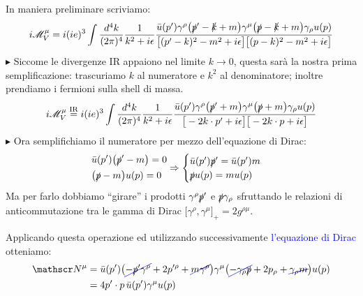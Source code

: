 \documentclass[../main.tex]{subfiles}
\begin{document}
In maniera preliminare scriviamo:
\begin{align*}
    i\mathscr M^\mu_V = i(ie)^3\int\frac{d^4k}{(2\pi)^4}\frac{1}{k^2+i\epsilon}\frac{\bar u(p')\gamma^\rho\big(\slashed p'-\slashed k + m\big)\gamma^\mu\big(\slashed p-\slashed k + m\big)\gamma_\rho u(p)}{\big[(p'-k)^2 -m^2 + i\epsilon\big]\big[(p-k)^2 -m^2 + i\epsilon\big]}
\end{align*}
$\blacktriangleright$ Siccome le divergenze IR appaiono nel limite \(\boxed{k\rightarrow0}\), questa sarà la nostra prima semplificazione: trascuriamo \(k\) al numeratore e \(k^2\) al denominatore; inoltre prendiamo i fermioni sulla shell di massa.
\begin{align*}
    i\mathscr M^\mu_V \overset{\text{IR}}{=} i(ie)^3\int\frac{d^4k}{(2\pi)^4}\frac{1}{k^2+i\epsilon}\frac{\bar u(p')\gamma^\rho\big(\slashed p' + m\big)\gamma^\mu\big(\slashed p+ m\big)\gamma_\rho u(p)}{\big[-2k\cdot p' + i\epsilon\big]\big[-2k\cdot p + i\epsilon\big]}
\end{align*}
$\blacktriangleright$ Ora semplifichiamo il numeratore per mezzo dell'equazione di Dirac:
\[
\begin{aligned}
    &\bar u(p') \big(\slashed p' - m\big) = 0  \\
    &\big(\slashed p - m\big)u(p) = 0
\end{aligned}
\Rightarrow
\begin{cases}
    \bar u(p') \slashed p' = \bar u(p')m \\
    \slashed p u(p)  =  m u(p)
\end{cases}
\]
Ma per farlo dobbiamo “girare” i prodotti \(\gamma^\rho \slashed p'\) e \(\slashed p\gamma_\rho\) sfruttando le relazioni di anticommutazione tra le gamma di Dirac \(\big[\gamma^\rho, \gamma^\mu\big]_+ = 2g^{\rho\mu}\).

Applicando questa operazione ed utilizzando successivamente \textcolor{blue}{l'equazione di Dirac} otteniamo:
\begin{align*}
    \mathscr N^\mu &= \bar u(p')\big(\Ccancel[blue]{-\slashed p'\gamma^\rho} + 2p'^\rho + \Ccancel[blue]{m\gamma^\rho}\big)\gamma^\mu\big(\Ccancel[blue]{-\gamma_\rho\slashed p} + 2p_\rho+ \Ccancel[blue]{\gamma_\rho m}\big) u(p)\\
    &=4p'\cdot p\,\bar u(p')\gamma^\mu u(p)
\end{align*}
\end{document}
